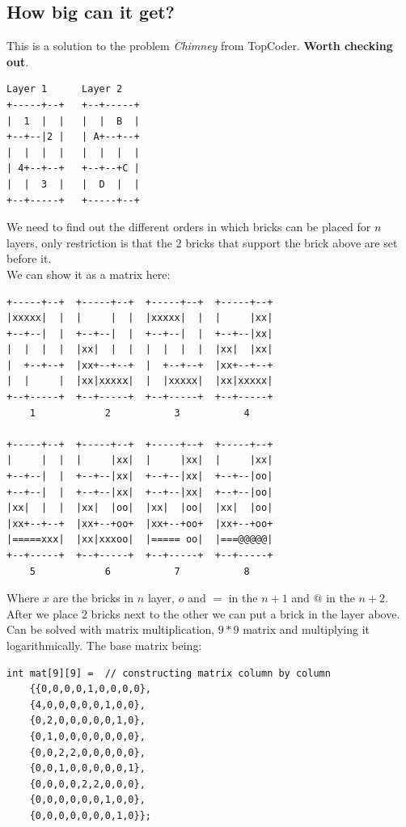 \documentclass{IEEEtran}
\begin{document}
        \subsection{How big can it get?}
            This is a solution to the problem \textit{Chimney} from TopCoder. \textbf{Worth checking out}.
            \begin{lstlisting}
Layer 1      Layer 2
+-----+--+   +--+-----+
|  1  |  |   |  |  B  |
+--+--|2 |   | A+--+--+
|  |  |  |   |  |  |  |
| 4+--+--+   +--+--+C |
|  |  3  |   |  D  |  |
+--+-----+   +-----+--+
            \end{lstlisting}
            We need to find out the different orders in which bricks can be placed for $n$ layers, only restriction is that the 2 bricks that support the brick above are set before it.\\
            We can show it as a matrix here:
            \begin{lstlisting}
+-----+--+  +-----+--+  +-----+--+  +-----+--+ 
|xxxxx|  |  |     |  |  |xxxxx|  |  |     |xx|  
+--+--|  |  +--+--|  |  +--+--|  |  +--+--|xx|    
|  |  |  |  |xx|  |  |  |  |  |  |  |xx|  |xx|    
|  +--+--+  |xx+--+--+  |  +--+--+  |xx+--+--+  
|  |     |  |xx|xxxxx|  |  |xxxxx|  |xx|xxxxx|  
+--+-----+  +--+-----+  +--+-----+  +--+-----+   
    1            2           3           4

+-----+--+  +-----+--+  +-----+--+  +-----+--+
|     |  |  |     |xx|  |     |xx|  |     |xx|
+--+--|  |  +--+--|xx|  +--+--|xx|  +--+--|oo| 
+--+--|  |  +--+--|xx|  +--+--|xx|  +--+--|oo|
|xx|  |  |  |xx|  |oo|  |xx|  |oo|  |xx|  |oo|
|xx+--+--+  |xx+--+oo+  |xx+--+oo+  |xx+--+oo+
|=====xxx|  |xx|xxxoo|  |===== oo|  |===@@@@@|  
+--+-----+  +--+-----+  +--+-----+  +--+-----+ 
    5            6           7           8
            \end{lstlisting}
            Where $x$ are the bricks in $n$ layer, $o$ and $=$ in the $n+1$ and $@$ in the $n+2$. After we place 2 bricks next to the other we can put a brick in the layer above.\\
            Can be solved with matrix multiplication, $9*9$ matrix and multiplying it logarithmically. The base matrix being:
            \begin{lstlisting}
int mat[9][9] =  // constructing matrix column by column
    {{0,0,0,0,1,0,0,0,0},
    {4,0,0,0,0,0,1,0,0},
    {0,2,0,0,0,0,0,1,0},
    {0,1,0,0,0,0,0,0,0},
    {0,0,2,2,0,0,0,0,0},
    {0,0,1,0,0,0,0,0,1},
    {0,0,0,0,2,2,0,0,0},
    {0,0,0,0,0,0,1,0,0},
    {0,0,0,0,0,0,0,1,0}};
            \end{lstlisting}
\end{document}
